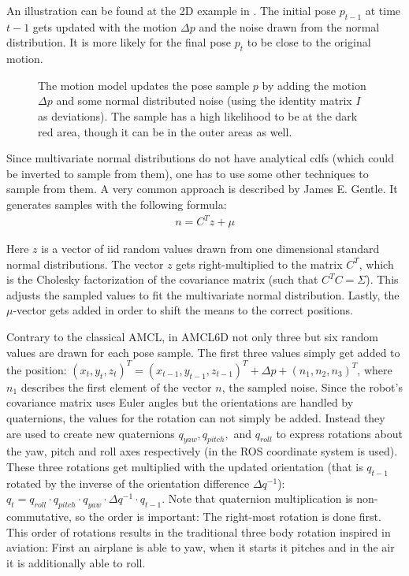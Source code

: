 \documentclass[Thesis.tex]{subfiles}
\begin{document}
An illustration can be found at the 2D example in . The initial pose $p_{t-1}$ at time $t-1$ gets updated with the motion $\Delta p$ and the noise drawn from the normal distribution. It is more likely for the final pose $p_t$ to be close to the original motion.
\begin{figure}[!htp]
  \centering
  
  \caption[2D motion model]{The motion model updates the pose sample $p$ by adding the motion $\Delta p$ and some normal distributed noise (using the identity matrix $I$ as deviations). The sample has a high likelihood to be at the dark red area, though it can be in the outer areas as well.}
  \label{fig:2d_noise_sampling}
\end{figure}
%
Since multivariate normal distributions do not have analytical \glspl{cdf} (which could be inverted to sample from them), one has to use some other techniques to sample from them. A very common approach is described by James E. Gentle\cite{Gentle:2005}. It generates samples with the following formula:
%
\begin{align}
n = C^T z + \mu \label{form:mvndsampling}
\end{align}

Here $z$ is a vector of \gls{iid} random values drawn from one dimensional standard normal distributions. The vector $z$ gets right-multiplied to the matrix $C^T$, which is the Cholesky factorization of the covariance matrix (such that $C^TC = \Sigma$). This adjusts the sampled values to fit the multivariate normal distribution. Lastly, the $\mu$-vector gets added in order to shift the means to the correct positions.

Contrary to the classical \gls{AMCL}, in \gls{AMCL6D} not only three but six random values are drawn for each pose sample. The first three values simply get added to the position: $(x_t, y_t, z_t)^T = (x_{t-1}, y_{t-1}, z_{t-1})^T + \Delta p + (n_1, n_2, n_3)^T$, where $n_1$ describes the first element of the vector $n$, the sampled noise.
Since the robot's covariance matrix uses Euler angles but the orientations are handled by quaternions, the values for the rotation can not simply be added. Instead they are used to create new quaternions $q_{yaw}, q_{pitch},$ and $q_{roll}$ to express rotations about the yaw, pitch and roll axes respectively (in  the \gls{ROS} coordinate system is used). These three rotations get multiplied with the updated orientation (that is $q_{t-1}$ rotated by the inverse of the orientation difference $\Delta q^{-1}$): $q_{t} = q_{roll} \cdot q_{pitch} \cdot q_{yaw} \cdot \Delta q^{-1} \cdot q_{t-1}$. Note that quaternion multiplication is non-commutative, so the order is important: The right-most rotation is done first. This order of rotations results in the traditional three body rotation inspired in aviation: First an airplane is able to yaw, when it starts it pitches and in the air it is additionally able to roll.
\end{document}
